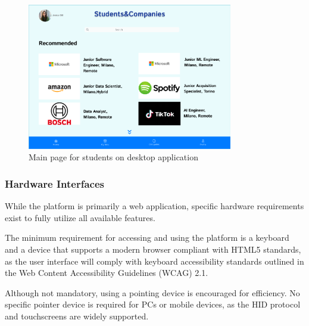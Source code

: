 \begin{figure}[ht]
    \centering
    \includegraphics[width=0.8\textwidth]{RASD-Latex/assets/UI images/mainpage_student_desktop.png}
    \caption{Main page for students on desktop application}
    \label{fig:image2}
\end{figure}




\clearpage
\subsubsection{Hardware Interfaces}
While the platform is primarily a web application, specific hardware requirements exist to fully utilize all available features.

The minimum requirement for accessing and using the platform is a keyboard and a device that supports a modern browser compliant with HTML5 standards, as the user interface will comply with keyboard accessibility standards outlined in the Web Content Accessibility Guidelines (WCAG) 2.1.

Although not mandatory, using a pointing device is encouraged for efficiency. No specific pointer device is required for PCs or mobile devices, as the HID protocol and touchscreens are widely supported.



